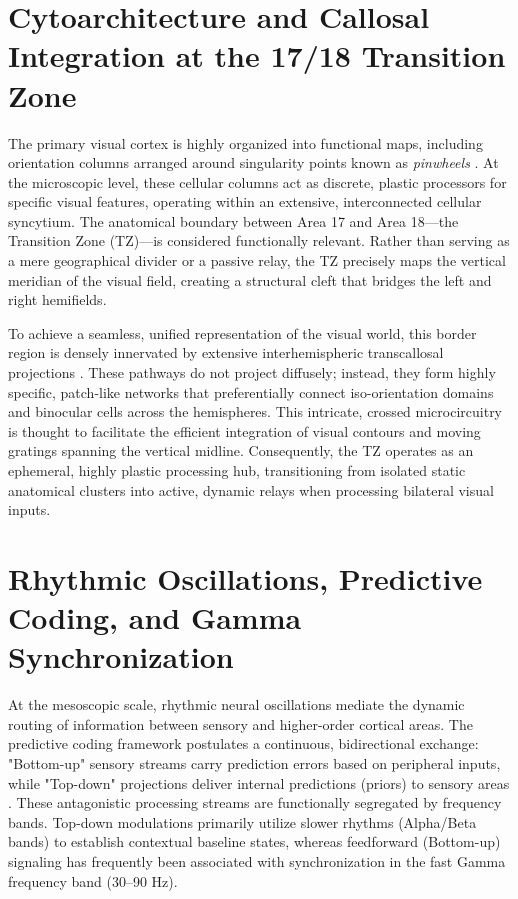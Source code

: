 \section{Cytoarchitecture and Callosal Integration at the 17/18 Transition Zone}
The primary visual cortex is highly organized into functional maps, including orientation columns arranged around singularity points known as \textit{pinwheels} \cite{schmidt2023}. At the microscopic level, these cellular columns act as discrete, plastic processors for specific visual features, operating within an extensive, interconnected cellular syncytium. The anatomical boundary between Area 17 and Area 18—the Transition Zone (TZ)—is considered functionally relevant. Rather than serving as a mere geographical divider or a passive relay, the TZ precisely maps the vertical meridian of the visual field, creating a structural cleft that bridges the left and right hemifields. 

To achieve a seamless, unified representation of the visual world, this border region is densely innervated by extensive interhemispheric transcallosal projections \cite{wunderle2013}. These pathways do not project diffusely; instead, they form highly specific, patch-like networks that preferentially connect iso-orientation domains and binocular cells across the hemispheres. This intricate, crossed microcircuitry is thought to facilitate the efficient integration of visual contours and moving gratings spanning the vertical midline. Consequently, the TZ operates as an ephemeral, highly plastic processing hub, transitioning from isolated static anatomical clusters into active, dynamic relays when processing bilateral visual inputs.

\section{Rhythmic Oscillations, Predictive Coding, and Gamma Synchronization}
At the mesoscopic scale, rhythmic neural oscillations mediate the dynamic routing of information between sensory and higher-order cortical areas. The predictive coding framework postulates a continuous, bidirectional exchange: "Bottom-up" sensory streams carry prediction errors based on peripheral inputs, while "Top-down" projections deliver internal predictions (priors) to sensory areas \cite{vezoli2021}. These antagonistic processing streams are functionally segregated by frequency bands. Top-down modulations primarily utilize slower rhythms (Alpha/Beta bands) to establish contextual baseline states, whereas feedforward (Bottom-up) signaling has frequently been associated with synchronization in the fast Gamma frequency band (30–90 Hz).

